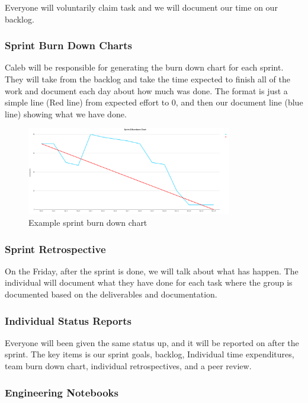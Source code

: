 Everyone will voluntarily claim task and we will document our time on our backlog.

\subsubsection{Sprint Burn Down Charts}

Caleb will be responsible for generating the burn down chart for each sprint. They will take from the backlog and take the time expected to finish all of the work and document each day about how much was done. The format is just a simple line (Red line) from expected effort to 0, and then our document line (blue line) showing what we have done.

\begin{figure}[h!]
    \centering
    \includegraphics[width=0.8\textwidth]{images/ExampleSprint}
    \caption{Example sprint burn down chart}
\end{figure}

\subsubsection{Sprint Retrospective}

On the Friday, after the sprint is done, we will talk about what has happen. The individual will document what they have done for each task where the group is documented based on the deliverables and documentation. 

\subsubsection{Individual Status Reports}

Everyone will been given the same status up, and it will be reported on after the sprint. The key items is our sprint goals, backlog, Individual time expenditures, team burn down chart, individual retrospectives, and a peer review. 

\subsubsection{Engineering Notebooks}

